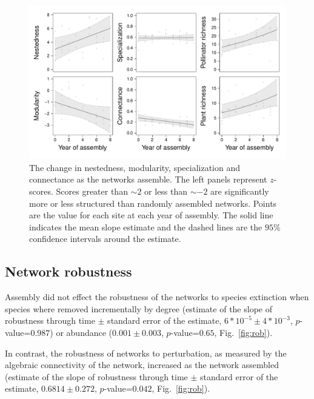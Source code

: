\documentclass[12pt]{article}
\begin{document}
\begin{figure}
  \centering
  \includegraphics[width=.7\textwidth]{../analysis/networkLevel/figures/baci.pdf}
  \caption{The change in nestedness, modularity, specialization and
    connectance as the networks assemble. The left panels represent
    $z$-scores. Scores greater than $\sim 2$ or less than $\sim -2$
    are significantly more or less structured than randomly assembled
    networks. Points are the value for each site at each year of
    assembly. The solid line indicates the mean slope estimate and the
    dashed lines are the $95\%$ confidence intervals around the
    estimate.}
  \label{fig:baci}
\end{figure}
\clearpage

\subsection*{Network robustness}
Assembly did not effect the robustness of the networks to species
extinction when species where removed incrementally by degree
(estimate of the slope of robustness through time $\pm$ standard error
of the estimate, $6*10^{-5} \pm 4*10^{-3}$, $p$-value=$0.987$) or
abundance ($0.001 \pm 0.003$, $p$-value=$0.65$, Fig.~\ref{fig:rob}).

In contrast, the robustness of networks to perturbation, as measured
by the algebraic connectivity of the network, increased as the network
assembled (estimate of the slope of robustness through time $\pm$
standard error of the estimate, $0.6814 \pm 0.272$, $p$-value=$0.042$,
Fig.~\ref{fig:rob}).
\end{document}
